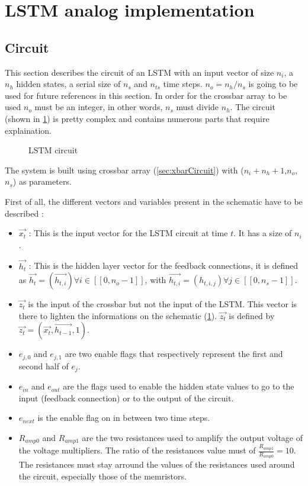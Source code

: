\section{\ac{LSTM} analog implementation}\label{sec:lstmCircuit}

\subsection{Circuit}

This section describes the circuit of an \ac{LSTM} with an input vector of size $n_i$, a $n_h$ hidden states, a serial size of $n_s$ and $n_{ts}$ time steps. $n_o=n_h/n_s$ is going to be used for future references in this section. In order for the crossbar array to be used $n_o$ must be an integer, in other words, $n_s$ must divide $n_h$. The circuit (shown in \cref{circt:lstm}) is pretty complex and contains numerous parts that require explaination.

\begin{figure}[H]
  \centering
  
  \caption{\ac{LSTM} circuit}
  \label{circt:lstm}
\end{figure}

The system is built using crossbar array (\cref{sec:xbarCircuit}) with ($n_i+n_h+1$,$n_o$, $n_s$) as parameters.

First of all, the different vectors and variables present in the schematic have to be described :

\begin{itemize}
  \item $\overrightarrow{x_t}$ : This is the input vector for the \ac{LSTM} circuit at time $t$. It has a size of $n_i$.
  \item $\overrightarrow{h_t}$ : This is the hidden layer vector for the feedback connections, it is defined as $\overrightarrow{h_t}=(\overrightarrow{h_{t,i}}) \forall i\in [\![0,n_o-1]\!]$, with $\overrightarrow{h_{t,i}}=(h_{t,i,j}) \forall j\in [\![0,n_s-1]\!]$.
  \item $\overrightarrow{z_t}$ is the input of the crossbar but not the input of the \ac{LSTM}. This vector is there to lighten the informations on the schematic (\cref{circt:lstm}). $\overrightarrow{z_t}$ is defined by $\overrightarrow{z_t}=(\overrightarrow{x_t},\overrightarrow{h_{t-1}},1)$.
  \item $e_{j,0}$ and $e_{j,1}$ are two enable flags that respectively represent the first and second half of $e_j$.
  \item $e_{in}$ and $e_{out}$ are the flags used to enable the hidden state values to go to the input (feedback connection) or to the output of the circuit.
  \item $e_{next}$ is the enable flag on in between two time steps.
  \item $R_{amp0}$ and $R_{amp1}$ are the two resistances used to amplify the output voltage of the voltage multipliers. The ratio of the resistances value must of $\frac{R_{amp1}}{R_{amp0}}=10$. The resistances must stay arround the values of the resistances used around the circuit, especially those of the memristors.
\end{itemize}


